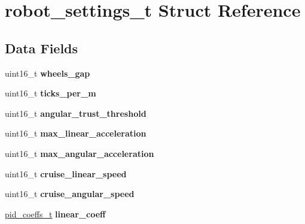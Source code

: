 \hypertarget{structrobot__settings__t}{}\section{robot\+\_\+settings\+\_\+t Struct Reference}
\label{structrobot__settings__t}
\subsection*{Data Fields}
\begin{DoxyCompactItemize}
\item 
\hypertarget{structrobot__settings__t_ae03b798ab2dc65c9c7e03ce50f401dde}{}\label{structrobot__settings__t_ae03b798ab2dc65c9c7e03ce50f401dde} 
uint16\+\_\+t {\bfseries wheels\+\_\+gap}
\item 
\hypertarget{structrobot__settings__t_ac96812aec65bd6853af9ec00589003f0}{}\label{structrobot__settings__t_ac96812aec65bd6853af9ec00589003f0} 
uint16\+\_\+t {\bfseries ticks\+\_\+per\+\_\+m}
\item 
\hypertarget{structrobot__settings__t_ab9d2a1fdaa3365a751633d6df30c27ee}{}\label{structrobot__settings__t_ab9d2a1fdaa3365a751633d6df30c27ee} 
uint16\+\_\+t {\bfseries angular\+\_\+trust\+\_\+threshold}
\item 
\hypertarget{structrobot__settings__t_a93dfbbd41423a58b7243b9e4a5f13d37}{}\label{structrobot__settings__t_a93dfbbd41423a58b7243b9e4a5f13d37} 
uint16\+\_\+t {\bfseries max\+\_\+linear\+\_\+acceleration}
\item 
\hypertarget{structrobot__settings__t_a5c4c0c84059ba7458462046cacb0381b}{}\label{structrobot__settings__t_a5c4c0c84059ba7458462046cacb0381b} 
uint16\+\_\+t {\bfseries max\+\_\+angular\+\_\+acceleration}
\item 
\hypertarget{structrobot__settings__t_a9c8a3a027978cc66f174020c1bed9c3c}{}\label{structrobot__settings__t_a9c8a3a027978cc66f174020c1bed9c3c} 
uint16\+\_\+t {\bfseries cruise\+\_\+linear\+\_\+speed}
\item 
\hypertarget{structrobot__settings__t_a58782a7f2118a05f3d438778f5e87049}{}\label{structrobot__settings__t_a58782a7f2118a05f3d438778f5e87049} 
uint16\+\_\+t {\bfseries cruise\+\_\+angular\+\_\+speed}
\item 
\hypertarget{structrobot__settings__t_a655ace2d05df0fc2ba0f8057fdd5f639}{}\label{structrobot__settings__t_a655ace2d05df0fc2ba0f8057fdd5f639} 
\hyperlink{structpid__coeffs__t}{pid\+\_\+coeffs\+\_\+t} {\bfseries linear\+\_\+coeff}
\item 

\end{DoxyCompactItemize}
